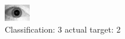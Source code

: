 \begin{figure}[h!]
\begin{center}
\includegraphics[width=0.60\columnwidth]{figures/ID1744_class_3_target_2.png}
\end{center}
\caption{ Classification: 3 actual target: 2}
\label{fig:ID1744_class_3_target_2}
\end{figure}
